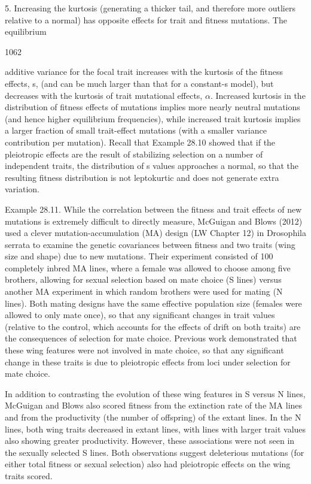 \documentclass{article}
\begin{document}
5. Increasing the kurtosis (generating a thicker tail, and therefore more outliers relative to a normal) has opposite effects for trait and fitness mutations. The equilibrium

1062

additive variance for the focal trait increases with the kurtosis of the fitness effects, s, (and can be much larger than that for a constant-s model), but decreases with the kurtosis of trait mutational effects,  $ \alpha $. Increased kurtosis in the distribution of fitness effects of mutations implies more nearly neutral mutations (and hence higher equilibrium frequencies), while increased trait kurtosis implies a larger fraction of small trait-effect mutations (with a smaller variance contribution per mutation). Recall that Example 28.10 showed that if the pleiotropic effects are the result of stabilizing selection on a number of independent traits, the distribution of s values approaches a normal, so that the resulting fitness distribution is not leptokurtic and does not generate extra variation.

Example 28.11. While the correlation between the fitness and trait effects of new mutations is extremely difficult to directly measure, McGuigan and Blows (2012) used a clever mutation-accumulation (MA) design (LW Chapter 12) in Drosophila serrata to examine the genetic covariances between fitness and two traits (wing size and shape) due to new mutations. Their experiment consisted of 100 completely inbred MA lines, where a female was allowed to choose among five brothers, allowing for sexual selection based on mate choice (S lines) versus another MA experiment in which random brothers were used for mating (N lines). Both mating designs have the same effective population size (females were allowed to only mate once), so that any significant changes in trait values (relative to the control, which accounts for the effects of drift on both traits) are the consequences of selection for mate choice. Previous work demonstrated that these wing features were not involved in mate choice, so that any significant change in these traits is due to pleiotropic effects from loci under selection for mate choice.

In addition to contrasting the evolution of these wing features in S versus N lines, McGuigan and Blows also scored fitness from the extinction rate of the MA lines and from the productivity (the number of offspring) of the extant lines. In the N lines, both wing traits decreased in extant lines, with lines with larger trait values also showing greater productivity. However, these associations were not seen in the sexually selected S lines. Both observations suggest deleterious mutations (for either total fitness or sexual selection) also had pleiotropic effects on the wing traits scored.
\end{document}
